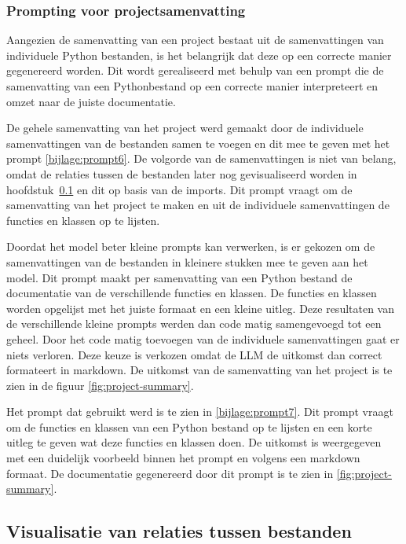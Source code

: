 \subsubsection{Prompting voor projectsamenvatting}
\label{sec:project-documentatie-prompting}

Aangezien de samenvatting van een project bestaat uit de samenvattingen van individuele Python bestanden, is het belangrijk dat deze op een correcte manier gegenereerd worden.
Dit wordt gerealiseerd met behulp van een prompt die de samenvatting van een Pythonbestand op een correcte manier interpreteert en omzet naar de juiste documentatie.

De gehele samenvatting van het project werd gemaakt door de individuele samenvattingen van de bestanden samen te voegen en dit mee te geven met het prompt \ref{bijlage:prompt6}.
De volgorde van de samenvattingen is niet van belang, omdat de relaties tussen de bestanden later nog gevisualiseerd worden in hoofdstuk~\ref{sec:project-documentatie-relaties} en dit op basis van de imports.
Dit prompt vraagt om de samenvatting van het project te maken en uit de individuele samenvattingen de functies en klassen op te lijsten.

Doordat het model beter kleine prompts kan verwerken, is er gekozen om de samenvattingen van de bestanden in kleinere stukken mee te geven aan het model.
Dit prompt maakt per samenvatting van een Python bestand de documentatie van de verschillende functies en klassen. 
De functies en klassen worden opgelijst met het juiste formaat en een kleine uitleg.
Deze resultaten van de verschillende kleine prompts werden dan code matig samengevoegd tot een geheel. 
Door het code matig toevoegen van de individuele samenvattingen gaat er niets verloren. 
Deze keuze is verkozen omdat de LLM de uitkomst dan correct formateert in markdown.  
De uitkomst van de samenvatting van het project is te zien in de figuur \ref{fig:project-summary}.

Het prompt dat gebruikt werd is te zien in \ref{bijlage:prompt7}.
Dit prompt vraagt om de functies en klassen van een Python bestand op te lijsten en een korte uitleg te geven wat deze functies en klassen doen.
De uitkomst is weergegeven met een duidelijk voorbeeld binnen het prompt en volgens een markdown formaat. 
De documentatie gegenereerd door dit prompt is te zien in \ref{fig:project-summary}.

\subsection{Visualisatie van relaties tussen bestanden}
\label{sec:project-documentatie-relaties}

